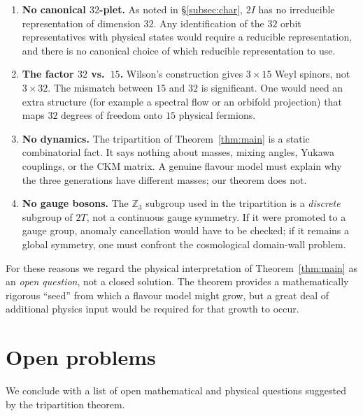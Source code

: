 \documentclass[10pt,reqno]{amsart}
\theoremstyle{plain}
\theoremstyle{definition}
\begin{document}
\begin{enumerate}
\item[1.] \textbf{No canonical $32$-plet.} As noted in \S\ref{subsec:char}, $2I$ has no irreducible representation of dimension $32$. Any identification of the $32$ orbit representatives with physical states would require a reducible representation, and there is no canonical choice of which reducible representation to use.

\item \textbf{The factor $32$ vs.\ $15$.} Wilson's construction gives $3 \times 15$ Weyl spinors, not $3 \times 32$. The mismatch between $15$ and $32$ is significant. One would need an extra structure (for example a spectral flow or an orbifold projection) that maps $32$ degrees of freedom onto $15$ physical fermions.

\item \textbf{No dynamics.} The tripartition of Theorem~\ref{thm:main} is a static combinatorial fact. It says nothing about masses, mixing angles, Yukawa couplings, or the CKM matrix. A genuine flavour model must explain why the three generations have different masses; our theorem does not.

\item \textbf{No gauge bosons.} The $\mathbb{Z}_3$ subgroup used in the tripartition is a \emph{discrete} subgroup of $2T$, not a continuous gauge symmetry. If it were promoted to a gauge group, anomaly cancellation would have to be checked; if it remains a global symmetry, one must confront the cosmological domain-wall problem.
\end{enumerate}

For these reasons we regard the physical interpretation of Theorem~\ref{thm:main} as an \emph{open question}, not a closed solution. The theorem provides a mathematically rigorous ``seed'' from which a flavour model might grow, but a great deal of additional physics input would be required for that growth to occur.

\section{Open problems}\label{sec:open}

We conclude with a list of open mathematical and physical questions suggested by the tripartition theorem.
\end{document}

